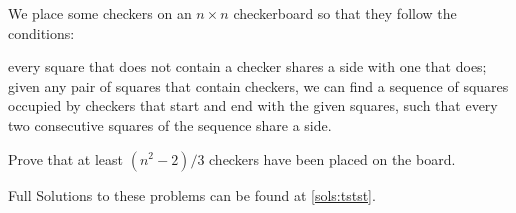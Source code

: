\begin{prob}\label{combi:5}
We place some checkers on an $n \times n$ checkerboard so that they follow the conditions:
	\begin{itemize}
		\ii every square that does not contain a checker shares a side with one that does;
		\ii given any pair of squares that contain checkers, we can find a sequence of squares occupied by
		checkers that start and end with the given squares, such that every two consecutive squares of the
		sequence share a side.
	\end{itemize}
Prove that at least $(n^2-2)/3$ checkers have been placed on the board.
	\begin{hint}
	\end{hint}
\end{prob}


Full Solutions to these problems can be found at \autoref{sols:tstst}.